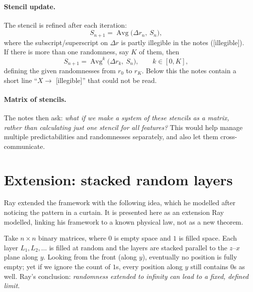 \documentclass[11pt,a4paper]{article}
\theoremstyle{definition}\newtheorem{definition}{Definition}
\begin{document}
\paragraph{Stencil update.} The stencil is refined after each iteration:
\begin{equation}
S_{n+1} = \operatorname{Avg}\bigl(\Delta r_n,\ S_n\bigr),
\end{equation}
where the subscript/superscript on $\Delta r$ is partly illegible in the notes ([illegible]). If there is more than one randomness, say $K$ of them, then
\begin{equation}
S_{n+1} = \operatorname{Avg}^{k}\bigl(\Delta r_k,\ S_n\bigr), \qquad k \in [0, K],
\end{equation}
defining the given randomnesses from $r_0$ to $r_K$. Below this the notes contain a short line ``$X \to$ [illegible]'' that could not be read.

\paragraph{Matrix of stencils.} The notes then ask: \emph{what if we make a system of these stencils as a matrix, rather than calculating just one stencil for all features?} This would help manage multiple predictabilities and randomnesses separately, and also let them cross-communicate.

\section{Extension: stacked random layers}
Ray extended the framework with the following idea, which he modelled after noticing the pattern in a curtain. It is presented here as an extension Ray modelled, linking his framework to a known physical law, not as a new theorem.

Take $n\times n$ binary matrices, where $0$ is empty space and $1$ is filled space. Each layer $L_1, L_2, \dots$ is filled at random and the layers are stacked parallel to the $z$--$x$ plane along $y$. Looking from the front (along $y$), eventually no position is fully empty; yet if we ignore the count of $1$s, every position along $y$ still contains $0$s as well. Ray's conclusion: \emph{randomness extended to infinity can lead to a fixed, defined limit.}
\end{document}
